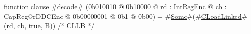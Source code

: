 function clause #\hyperref[sailMIPSzdecode]{decode}# (0b010010 @ 0b10000 @ rd : IntRegEnc @ cb : CapRegOrDDCEnc @ 0b00000001 @ 0b1 @ 0b00) = #\hyperref[sailMIPSzSome]{Some}#(#\hyperref[sailMIPSzCLoadLinked]{CLoadLinked}#(rd, cb, true,  B)) /* CLLB  */
